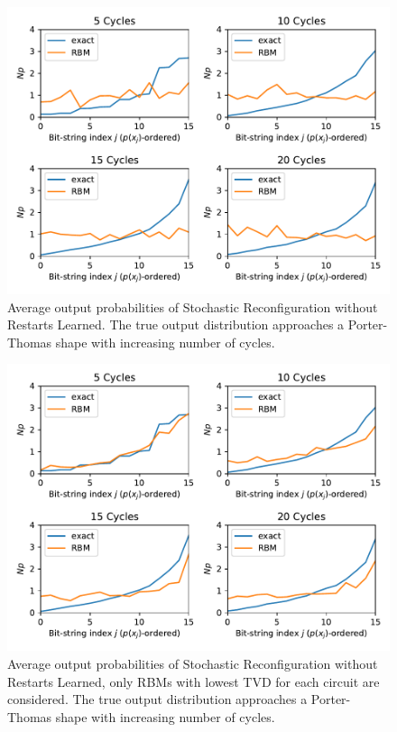 \begin{figure}[H]
  \centering
  \includegraphics[width=\textwidth]{figures/results/SR-no-restarts-learned/avgPDF.pdf}
  \caption[Average output probabilities of Stochastic Reconfiguration without Restarts Learned]{
    Average output probabilities of Stochastic Reconfiguration without Restarts Learned. The true 
    output distribution approaches a Porter-Thomas shape with increasing number of cycles.}
  \label{fig:sr_tvd}
\end{figure}

\begin{figure}[H]
  \centering
  \includegraphics[width=\textwidth]{figures/results/SR-no-restarts-learned/avgBestPDF.pdf}
  \caption[Averaged best performing output probabilities of Stochastic Reconfiguration without Restarts Learned]{
    Average output probabilities of Stochastic Reconfiguration without Restarts Learned, only RBMs with lowest
    TVD for each circuit are considered. The true 
    output distribution approaches a Porter-Thomas shape with increasing number of cycles.}
  \label{fig:sr_tvd}
\end{figure}

